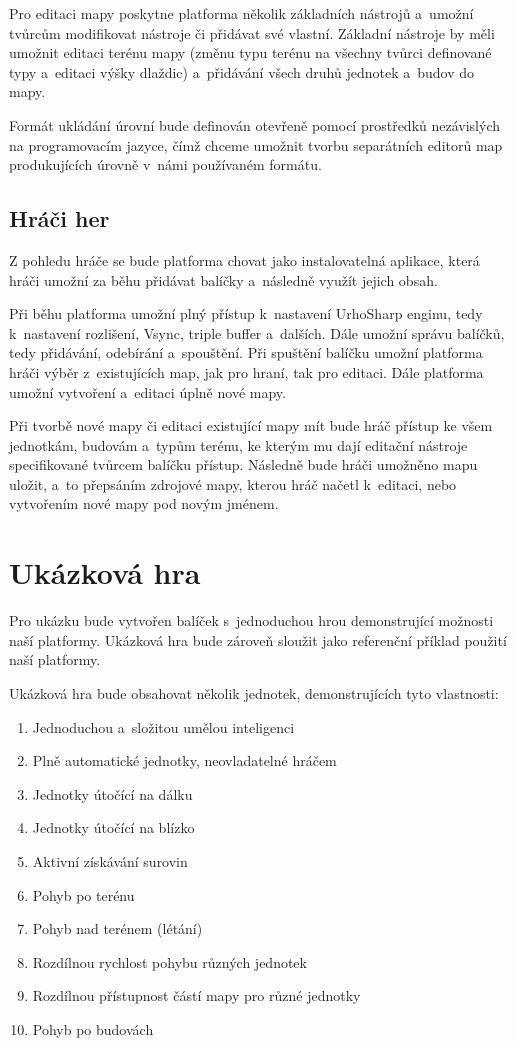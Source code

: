 Pro editaci mapy poskytne platforma několik základních nástrojů a~umožní tvůrcům modifikovat nástroje či přidávat své vlastní. Základní nástroje by měli umožnit editaci terénu mapy (změnu typu terénu na všechny tvůrci definované typy a~editaci výšky dlaždic) a~přidávání všech druhů jednotek a~budov do mapy.

Formát ukládání úrovní bude definován otevřeně pomocí prostředků nezávislých na programovacím jazyce, čímž chceme umožnit tvorbu separátních editorů map produkujících úrovně v~námi používaném formátu.

\subsection{Hráči her}
Z pohledu hráče se bude platforma chovat jako instalovatelná aplikace, která hráči umožní za běhu přidávat balíčky a~následně využít jejich obsah.

Při běhu platforma umožní plný přístup k~nastavení UrhoSharp enginu, tedy k~nastavení rozlišení, Vsync, triple buffer a~dalších. Dále umožní správu balíčků, tedy přidávání, odebírání a~spouštění. Při spuštění balíčku umožní platforma hráči výběr z~existujících map, jak pro hraní, tak pro editaci. Dále platforma umožní vytvoření a~editaci úplně nové mapy.

Při tvorbě nové mapy či editaci existující mapy mít bude hráč přístup ke všem jednotkám, budovám a~typům terénu, ke kterým mu dají editační nástroje specifikované tvůrcem balíčku přístup. Následně bude hráči umožněno mapu uložit, a~to přepsáním zdrojové mapy, kterou hráč načetl k~editaci, nebo vytvořením nové mapy pod novým jménem.

\section{Ukázková hra}
\label{sec:showcasedef}

Pro ukázku bude vytvořen balíček s~jednoduchou hrou demonstrující možnosti naší platformy. Ukázková hra bude zároveň sloužit jako referenční příklad použití naší platformy.

Ukázková hra bude obsahovat několik jednotek, demonstrujících tyto vlastnosti:
\begin{enumerate}
	\item Jednoduchou a~složitou umělou inteligenci
	\item Plně automatické jednotky, neovladatelné hráčem
	\item Jednotky útočící na dálku
	\item Jednotky útočící na blízko
	\item Aktivní získávání surovin
	\item Pohyb po terénu
	\item Pohyb nad terénem (létání)
	\item Rozdílnou rychlost pohybu různých jednotek
	\item Rozdílnou přístupnost částí mapy pro různé jednotky
	\item Pohyb po budovách
\end{enumerate}

